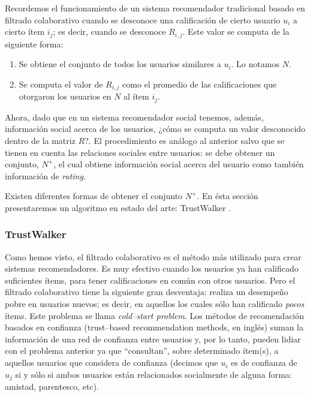 		Recordemos el funcionamiento de un sistema recomendador tradicional basado en filtrado colaborativo cuando se desconoce una calificación de cierto usuario $u_i$ a cierto ítem $i_j$; es decir, cuando se desconoce $R_{i,j}$. Este valor se computa de la siguiente forma:
		\begin{enumerate}
			\item Se obtiene el conjunto de todos los usuarios similares a $u_i$. Lo notamos $N$.
			\item Se computa el valor de $R_{i,j}$ como el promedio de las calificaciones que otorgaron los usuarios en $N$ al ítem $i_j$.
		\end{enumerate}
		
		Ahora, dado que en un sistema recomendador social tenemos, además, información social acerca de los usuarios, ¿cómo se computa un valor desconocido dentro de la matriz $R$?. El procedimiento es análogo al anterior salvo que se tienen en cuenta las relaciones sociales entre usuarios: se debe obtener un conjunto, $N^+$, el cual obtiene información social acerca del usuario como también información de \textit{rating}. \par
		
		Existen diferentes formas de obtener el conjunto $N^+$. En ésta sección presentaremos un algoritmo en estado del arte: TrustWalker \cite{jamali2009}.
		
		\subsubsection{TrustWalker}
			Como hemos visto, el filtrado colaborativo es el método más utilizado para crear sistemas recomendadores. Es muy efectivo cuando los usuarios ya han calificado suficientes ítems, para tener calificaciones en común con otros usuarios. Pero el filtrado colaborativo tiene la siguiente gran desventaja: realiza un desempeño pobre en usuarios nuevos; es decir, en aquellos los cuales sólo han calificado \textit{pocos} ítems. Este problema se llama \textit{cold--start problem}. Los métodos de recomendación basados en confianza (trust--based recommendation methods, en inglés) suman la información de una red de confianza entre usuarios y, por lo tanto, pueden lidiar con el problema anterior ya que \enquote{consultan}, sobre determinado ítem(s), a aquellos usuarios que considera de confianza (decimos que $u_i$ es de confianza de $u_j$ si y sólo si ambos usuarios están relacionados socialmente de alguna forma: amistad, parentesco, etc). \par
			
